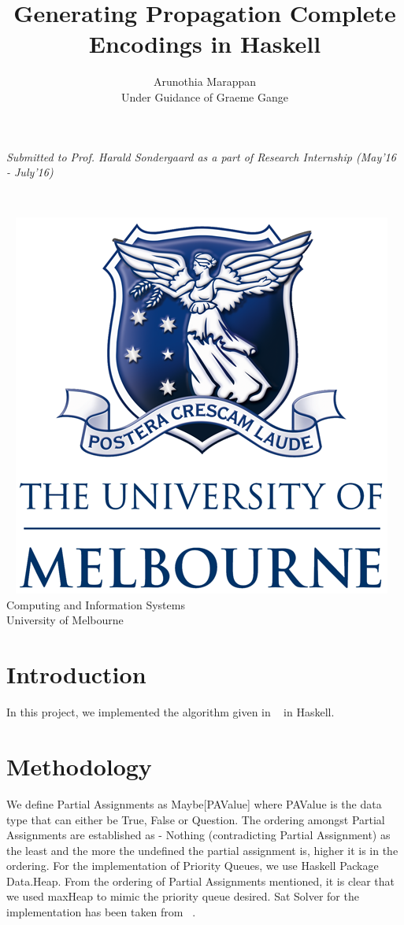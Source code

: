 \documentclass{article}
\title{Generating Propagation Complete Encodings in Haskell \\ }
\author{\vspace{2mm} \large Arunothia Marappan \\ Under Guidance of Graeme Gange }
\date{}
\theoremstyle{plain}
\begin{document}
\maketitle
\begin{center}
\emph{Submitted to Prof. Harald Sondergaard as a part of Research Internship (May'16 - July'16)}
\end{center}
\vspace*{2cm}~
\begin{abstract}
      
\end{abstract}

\begin{center}
\vspace*{7cm}~ \includegraphics[scale=1]{UOM.png} \\
\large{Computing and Information Systems \\ University of Melbourne}
\end{center}
\newpage
\section{Introduction}
 In this project, we implemented the algorithm given in ~\cite{PCE} in Haskell. 

\section{Methodology} 
We define Partial Assignments as Maybe[PAValue] where PAValue is the data type that can either be True, False or Question. The ordering amongst Partial Assignments are established as - Nothing (contradicting Partial Assignment) as the least and the more the undefined the partial assignment is, higher it is in the ordering. For the implementation of Priority Queues, we use Haskell Package Data.Heap. From the ordering of Partial Assignments mentioned, it is clear that we used maxHeap to mimic the priority queue desired. Sat Solver for the implementation has been taken from ~\cite{sat.hs}.
\end{document}
